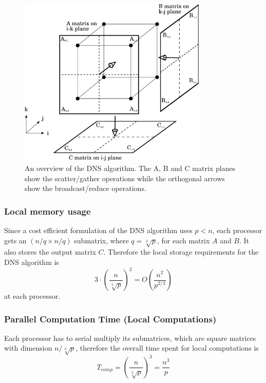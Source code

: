 \documentclass{article}
\begin{document}
\vspace{10pt}

\begin{figure}[h]
	\centering
	\includegraphics[width=0.8\textwidth]{images/dns.pdf}
    \caption{An overview of the DNS algorithm.  The A, B and C matrix planes show the scatter/gather operations while the orthogonal arrows show the broadcast/reduce operations.}
    \label{fig:all_results}
\end{figure}

\subsubsection{Local memory usage}

Since a cost efficient formulation of the DNS algorithm uses $p < n$, each
processor gets an $(n/q \times n/q)$ submatrix, where $q = \sqrt[3]{p}$, for
each matrix $A$ and $B$.  It also stores the output matrix $C$.  Therefore the
local storage requirements for the DNS algorithm is $$3 \cdot {\left(\frac{n}{\sqrt[3]{p}}\right)}^2 = O\left(\frac{n^2}{p^{2/3}}\right)$$ at each
processor.

\subsubsection{Parallel Computation Time (Local Computations)}

Each processor has to serial multiply its submatrices, which are square matrices with dimension $ n/\sqrt[3]{p}$, therefore the
overall time spent for local computations is 
$$T_{{comp}} = \left(\frac{n}{\sqrt[3]{p}}\right)^3 = \frac{n^3}{p}$$
\end{document}
